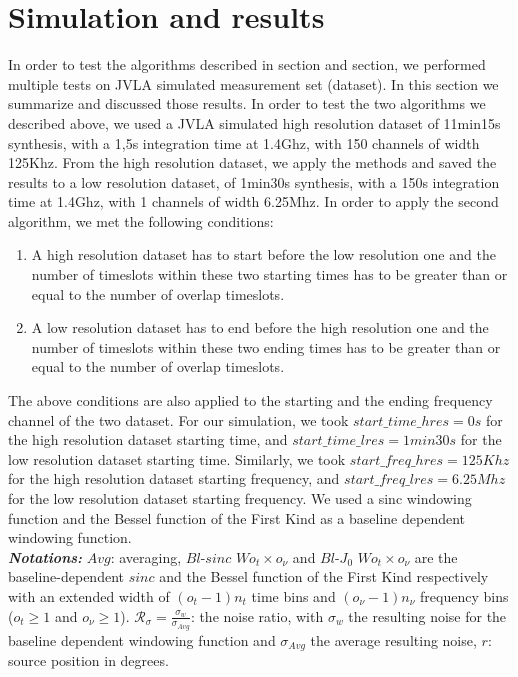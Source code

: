 \documentclass[useAMS,usenatbib]{mn2e}
\begin{document}
\section{Simulation and results}
In order to test the algorithms described in section and section, we performed  multiple tests on JVLA simulated measurement set 
(dataset). In this section we summarize and discussed those results.
In order to test the two algorithms we described above, we used a JVLA 
simulated high resolution dataset of 11min15s synthesis, with a 1,5s integration time at 1.4Ghz,  with 150 channels of width 125Khz. From 
the high resolution dataset, we apply the methods and saved the results to a low resolution dataset, of 1min30s synthesis, with a 150s 
integration time at 1.4Ghz,  with 1 channels of width 6.25Mhz. In order to apply the second algorithm, we met the following conditions:
\begin{enumerate}
 \item A  high resolution dataset has to start before the low resolution one and the number of timeslots within these two starting times 
     has to be greater than or equal to the number of overlap timeslots.
  \item A low resolution dataset has to end before the high resolution one and the number of timeslots within these two ending times has to 
     be greater than or equal to the number of overlap timeslots.
\end{enumerate}
The above conditions are also applied to the starting and the ending frequency channel of the two dataset.
For our simulation, we took $start\_time\_hres=0s$ for the high resolution dataset starting time, and $start\_time\_lres=1min30s$ for the 
low resolution dataset starting time. Similarly, we took $start\_freq\_hres=125Khz$ for the high resolution dataset starting frequency, and 
$start\_freq\_lres=6.25Mhz$ for the low resolution dataset starting frequency. We used a sinc windowing function and the Bessel function of 
the First Kind as a baseline dependent windowing function.\\
{\footnotesize \textbf{ \textit{ Notations:}}
$Avg$: averaging, $Bl$-$sinc$ $Wo_t \times o_{\nu}$ and $Bl$-$J_0$ $Wo_t \times o_{\nu}$ are the baseline-dependent $sinc$ and the Bessel 
function of the First Kind respectively with an extended width of $(o_t-1)n_t$ time bins and $(o_{\nu}-1)n_{\nu}$ frequency bins ($o_t \geq 
1$ and $o_{\nu} \geq 1$).  $\mathcal{R}_{\sigma}=\frac{\sigma_{w}}{\sigma_{Avg}}$: the noise ratio, with $\sigma_{w}$  the resulting noise 
for the baseline dependent windowing function and $\sigma_{Avg}$ the average resulting noise, $r$: source position in degrees.}
\end{document}
